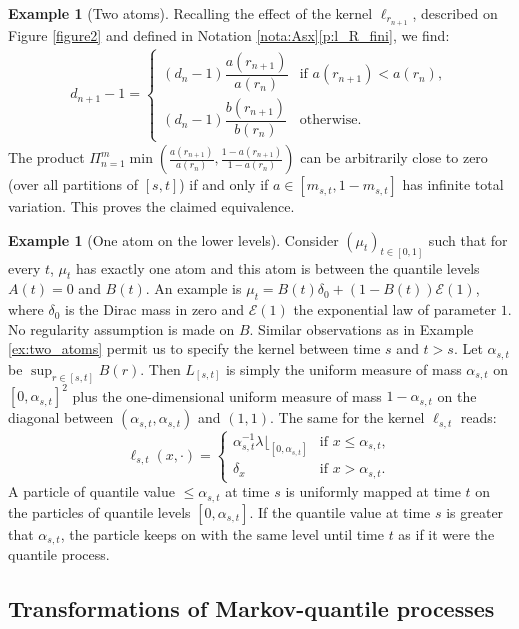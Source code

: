 \documentclass[11pt]{article}
\newcommand{\Subsection}{\subsection}
\theoremstyle{plain}
\theoremstyle{definition}
\newtheorem{ex}[them]{Example}
\newcommand{\la}{\lambda}
\begin{document}
\begin{ex}[Two atoms]
Recalling the effect of the kernel $\ell_{r_{n+1}}$, described on Figure \ref{figure2} and defined in Notation \ref{nota:Asx}\eqref{p:l_R_fini}, we find:\vspace*{-5pt}
\begin{align*}
d_{n+1}-1=
\begin{cases}
(d_{n}-1)\dfrac{a(r_{n+1})}{a(r_n)}&\text{if }a(r_{n+1})<a(r_n),\\[8pt]
(d_n-1)\dfrac{b(r_{n+1})}{b(r_n)}&\text{otherwise.}
\end{cases}
\end{align*}
The product $\Pi_{n=1}^m\min(\frac{a(r_{n+1})}{a(r_n)},\frac{1-a(r_{n+1})}{1-a(r_n)})$ can be arbitrarily close to zero (over all partitions of $[s,t]$) if and only if $a\in[m_{s,t},1-m_{s,t}]$ has infinite total variation. This proves the claimed equivalence.
\end{ex}

\begin{ex}[One atom on the lower levels]\label{ex:exponential}
Consider $(\mu_t)_{t\in{[0,1]}}$ such that for every $t$, $\mu_t$ has exactly one atom and this atom is between the quantile levels $A(t)=0$ and $B(t)$. An example is $\mu_t=B(t)\delta_0+(1-B(t))\mathcal{E}(1)$, where $\delta_0$ is the Dirac mass in zero and $\mathcal{E}(1)$ the exponential law of parameter $1$. No regularity assumption is made on $B$. Similar observations as in Example \ref{ex:two_atoms} permit us to specify the kernel between time $s$ and $t>s$. Let $\alpha_{s,t}$ be $\sup_{r\in[s,t]}B(r)$. Then $L_{[s,t]}$ is simply the uniform measure of mass $\alpha_{s,t}$ on $[0,\alpha_{s,t}]^2$ plus the one-dimensional uniform measure of mass $1-\alpha_{s,t}$ on the diagonal between $(\alpha_{s,t},\alpha_{s,t})$ and $(1,1)$. The same for the kernel $\ell_{s,t}$ reads:
\[
\ell_{s,t}(x,\cdot)=
\begin{cases}
\alpha_{s,t}^{-1}\la\lfloor_{[0,\alpha_{s,t}]}&\text{if }x\leq \alpha_{s,t},\\
\delta_x&\text{if }x>\alpha_{s,t}.
\end{cases}
\]
A particle of quantile value $\leq \alpha_{s,t}$ at time $s$ is uniformly mapped at time $t$ on the particles of quantile levels $[0,\alpha_{s,t}]$. If the quantile value at time $s$ is greater that $\alpha_{s,t}$, the particle keeps on with the same level until time $t$ as if it were the quantile process.
\end{ex}

\Subsection{Transformations of Markov-quantile processes}
\end{document}
